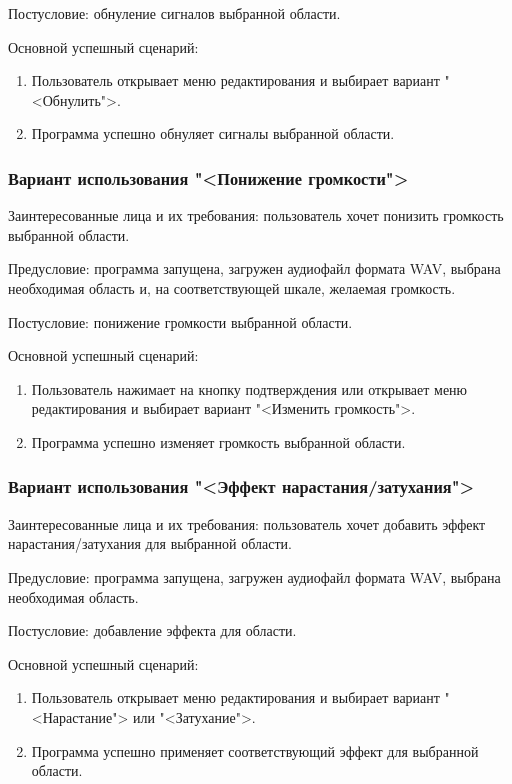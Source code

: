 Постусловие: обнуление сигналов выбранной области.

Основной успешный сценарий:
\begin{enumerate}
	\item Пользователь открывает меню редактирования и выбирает вариант "<Обнулить">.
	\item Программа успешно обнуляет сигналы выбранной области.
\end{enumerate} 

\subsubsection{Вариант использования "<Понижение громкости">}

Заинтересованные лица и их требования: пользователь хочет понизить громкость выбранной области.

Предусловие: программа запущена, загружен аудиофайл формата WAV, выбрана необходимая область и, на соответствующей шкале, желаемая громкость.

Постусловие: понижение громкости выбранной области.

Основной успешный сценарий:
\begin{enumerate}
	\item Пользователь нажимает на кнопку подтверждения или открывает меню редактирования и выбирает вариант "<Изменить громкость">.
	\item Программа успешно изменяет громкость выбранной области.
\end{enumerate} 

\subsubsection{Вариант использования "<Эффект нарастания/затухания">}

Заинтересованные лица и их требования: пользователь хочет добавить эффект нарастания/затухания для выбранной области.

Предусловие: программа запущена, загружен аудиофайл формата WAV, выбрана необходимая область.

Постусловие: добавление эффекта для области.

Основной успешный сценарий:
\begin{enumerate}
	\item Пользователь открывает меню редактирования и выбирает вариант "<Нарастание"> или "<Затухание">.
	\item Программа успешно применяет соответствующий эффект для выбранной области.
\end{enumerate} 

